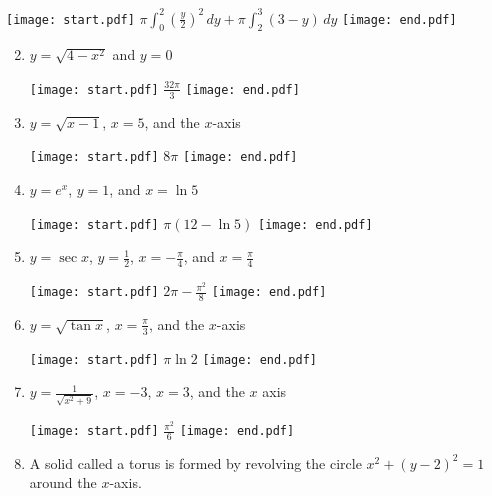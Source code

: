\documentclass[12pt]{article}
\begin{document}
\begin{enumerate}
\begin{enumerate}
\begin{center}
\end{center}

\texttt{[image: start.pdf]}
{{$\pi\int_0^2 \left(\frac{y}{2}\right)^2 \,dy+\pi\int_2^3 (3-y) \,dy$}}
\texttt{[image: end.pdf]}


\end{enumerate}

\end{enumerate}


\begin{enumerate}
\setcounter{enumi}{1}

\item $y=\sqrt{4-x^2}$ and $y=0$

\texttt{[image: start.pdf]}
{{$\frac{32\pi}{3}$}}
\texttt{[image: end.pdf]}


\item $y=\sqrt{x-1}$, $x=5$, and the $x$-axis

\texttt{[image: start.pdf]}
{{$8\pi$}}
\texttt{[image: end.pdf]}


\item $y=e^x$, $y=1$, and $x=\ln{5}$

\texttt{[image: start.pdf]}
{{$\pi(12-\ln{5})$}}
\texttt{[image: end.pdf]}


\item $y=\sec{x}$, $y=\frac{1}{2}$, $x=-\frac{\pi}{4}$, and $x=\frac{\pi}{4}$

\texttt{[image: start.pdf]}
{{$2\pi-\frac{\pi^2}{8}$}}
\texttt{[image: end.pdf]}


\item $y=\sqrt{\tan{x}}$, $x=\frac{\pi}{3}$, and the $x$-axis

\texttt{[image: start.pdf]}
{{$\pi\ln{2}$}}
\texttt{[image: end.pdf]}


\item $y=\frac{1}{\sqrt{x^2+9}}$, $x=-3$, $x=3$, and the $x$ axis

\texttt{[image: start.pdf]}
{{$\frac{\pi^2}{6}$}}
\texttt{[image: end.pdf]}


\item A solid called a torus is formed by revolving the circle $x^2+(y-2)^2=1$ around the $x$-axis. 


\end{enumerate}
\end{document}
